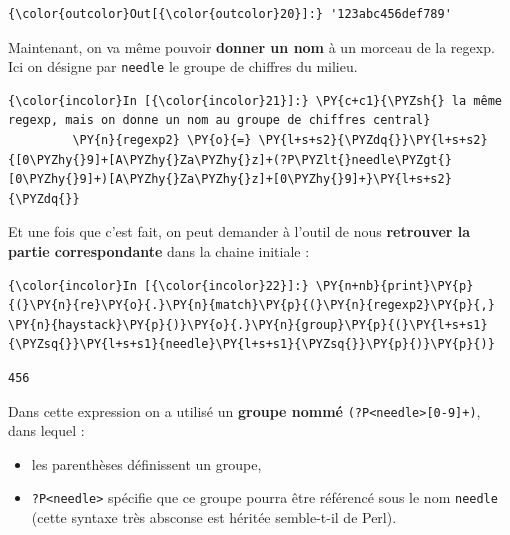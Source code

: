 \begin{Verbatim}[commandchars=\\\{\}]
{\color{outcolor}Out[{\color{outcolor}20}]:} '123abc456def789'
\end{Verbatim}
            
    Maintenant, on va même pouvoir \textbf{donner un nom} à un morceau de la
regexp. Ici on désigne par \texttt{needle} le groupe de chiffres du
milieu.

    \begin{Verbatim}[commandchars=\\\{\}]
{\color{incolor}In [{\color{incolor}21}]:} \PY{c+c1}{\PYZsh{} la même regexp, mais on donne un nom au groupe de chiffres central}
         \PY{n}{regexp2} \PY{o}{=} \PY{l+s+s2}{\PYZdq{}}\PY{l+s+s2}{[0\PYZhy{}9]+[A\PYZhy{}Za\PYZhy{}z]+(?P\PYZlt{}needle\PYZgt{}[0\PYZhy{}9]+)[A\PYZhy{}Za\PYZhy{}z]+[0\PYZhy{}9]+}\PY{l+s+s2}{\PYZdq{}}
\end{Verbatim}


    Et une fois que c'est fait, on peut demander à l'outil de nous
\textbf{retrouver la partie correspondante} dans la chaine initiale :

    \begin{Verbatim}[commandchars=\\\{\}]
{\color{incolor}In [{\color{incolor}22}]:} \PY{n+nb}{print}\PY{p}{(}\PY{n}{re}\PY{o}{.}\PY{n}{match}\PY{p}{(}\PY{n}{regexp2}\PY{p}{,} \PY{n}{haystack}\PY{p}{)}\PY{o}{.}\PY{n}{group}\PY{p}{(}\PY{l+s+s1}{\PYZsq{}}\PY{l+s+s1}{needle}\PY{l+s+s1}{\PYZsq{}}\PY{p}{)}\PY{p}{)}
\end{Verbatim}


    \begin{Verbatim}[commandchars=\\\{\}]
456

    \end{Verbatim}

    Dans cette expression on a utilisé un \textbf{groupe nommé}
\texttt{(?P\textless{}needle\textgreater{}{[}0-9{]}+)}, dans lequel :

\begin{itemize}
	\item 
	les parenthèses définissent un groupe,
	\item
	\texttt{?P\textless{}needle\textgreater{}} spécifie que ce groupe pourra
	être référencé sous le nom \texttt{needle} (cette syntaxe très absconse
	est héritée semble-t-il de Perl).
\end{itemize}

